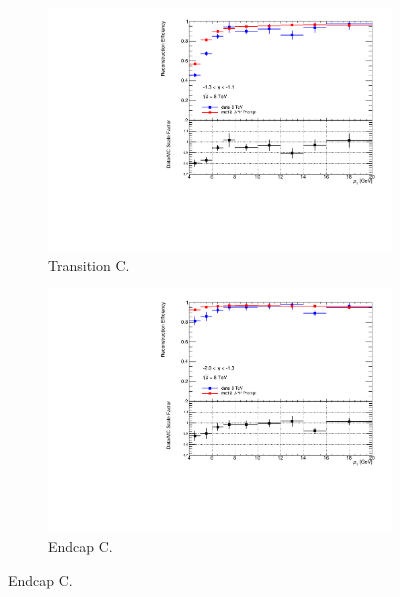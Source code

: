 \begin{figure}[htbp]
  \begin{subfigure}[b]{0.45\textwidth}
    \includegraphics[width=\textwidth]{PartCalibration2012/Plots/SFPlots/Transition_C_reco.pdf}
    \caption{Transition C.} \label{fig:CalibrationRecoSFTransitionC}
  \end{subfigure}
  \hfill
  \begin{subfigure}[b]{0.45\textwidth}
    \includegraphics[width=\textwidth]{PartCalibration2012/Plots/SFPlots/Endcap_C_reco.pdf}
    \caption{Endcap C.} \label{fig:CalibrationRecoSFEndcapC}
  \end{subfigure}


\end{figure}
